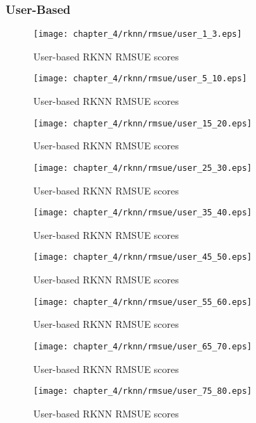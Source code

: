 \subsubsection{User-Based}

\begin{figure}[H]
\centering
\texttt{[image: chapter\_4/rknn/rmsue/user\_1\_3.eps]}
\caption{User-based RKNN RMSUE scores}
\end{figure}

\begin{figure}[H]
\centering
\texttt{[image: chapter\_4/rknn/rmsue/user\_5\_10.eps]}
\caption{User-based RKNN RMSUE scores}
\end{figure}

\begin{figure}[H]
\centering
\texttt{[image: chapter\_4/rknn/rmsue/user\_15\_20.eps]}
\caption{User-based RKNN RMSUE scores}
\end{figure}

\begin{figure}[H]
\centering
\texttt{[image: chapter\_4/rknn/rmsue/user\_25\_30.eps]}
\caption{User-based RKNN RMSUE scores}
\end{figure}

\begin{figure}[H]
\centering
\texttt{[image: chapter\_4/rknn/rmsue/user\_35\_40.eps]}
\caption{User-based RKNN RMSUE scores}
\end{figure}

\begin{figure}[H]
\centering
\texttt{[image: chapter\_4/rknn/rmsue/user\_45\_50.eps]}
\caption{User-based RKNN RMSUE scores}
\end{figure}

\begin{figure}[H]
\centering
\texttt{[image: chapter\_4/rknn/rmsue/user\_55\_60.eps]}
\caption{User-based RKNN RMSUE scores}
\end{figure}

\begin{figure}[H]
\centering
\texttt{[image: chapter\_4/rknn/rmsue/user\_65\_70.eps]}
\caption{User-based RKNN RMSUE scores}
\end{figure}

\begin{figure}[H]
\centering
\texttt{[image: chapter\_4/rknn/rmsue/user\_75\_80.eps]}
\caption{User-based RKNN RMSUE scores}
\end{figure}

